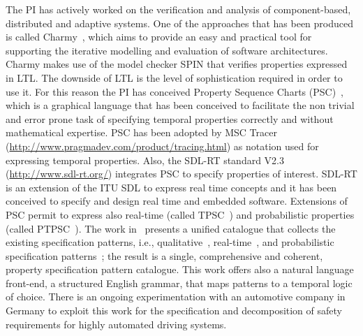 \documentclass[12pt]{article}
\newcommand{\nb}[2]{
    \fcolorbox{gray}{yellow}{\bfseries\sffamily\scriptsize#1}
    {\sf\small$\blacktriangleright$\textit{#2}$\blacktriangleleft$}
   }
\newcommand{\nb}[2]{}
\newcommand\patrizio[1]{\nb{Patrizio}{#1}}
\begin{document}

The PI has actively worked on the verification and analysis of %
component-based, distributed and adaptive systems. 
One of the approaches that has been produced is called Charmy~\cite{Pelliccione2009}, which aims to provide an easy and practical tool for supporting the iterative modelling and evaluation of software architectures. %
Charmy makes use of the model checker SPIN that verifies properties expressed in LTL. The downside of LTL is the level of sophistication required in order to use it. 
For this reason the PI has conceived Property Sequence Charts (PSC)~\cite{AIP07}, which is a graphical language that has been conceived to facilitate the non trivial and error prone task of specifying
temporal properties correctly and without mathematical expertise. 
PSC has been adopted by MSC Tracer ({\small \url{http://www.pragmadev.com/product/tracing.html}}) as notation used for expressing temporal properties. Also, the SDL-RT standard V2.3 ({\small \url{http://www.sdl-rt.org/}}) 
integrates PSC to specify properties of interest. SDL-RT is an extension of the ITU SDL to express real time concepts
and it has been conceived to specify and design real time and embedded software. Extensions of PSC permit to express also real-time (called TPSC~\cite{TPSC}) and probabilistic properties (called PTPSC~\cite{PTPSC}). 
The work in~\cite{TSE2015} presents a unified catalogue that collects the existing specification patterns, i.e., qualitative~\cite{dwyer-99}, real-time~\cite{Konrad2005}, and probabilistic specification patterns~\cite{Grunske2008}; %
the result is a single, comprehensive and coherent, property specification
pattern catalogue. This work offers also a natural language front-end, a structured English grammar, that maps patterns to a temporal logic of choice.
There is an ongoing experimentation with an automotive company in Germany to exploit this work for the specification and decomposition of safety requirements for highly automated driving systems.
\end{document}
